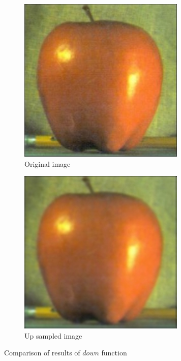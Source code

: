 \begin{figure}[!h]
\centering
\begin{subfigure}{0.5\textwidth}
  \centering
  \includegraphics[width=0.8\linewidth]{input/p1-1-3.png}
  \caption{Original image}
\end{subfigure}%
\begin{subfigure}{0.5\textwidth}
  \centering
  \includegraphics[width=0.8\linewidth]{output/upSample.jpg}
  \caption{Up sampled image}
\end{subfigure}%
 \caption{Comparison of results of $down$ function}
\label{fig:down-gauss-results}
\end{figure}

